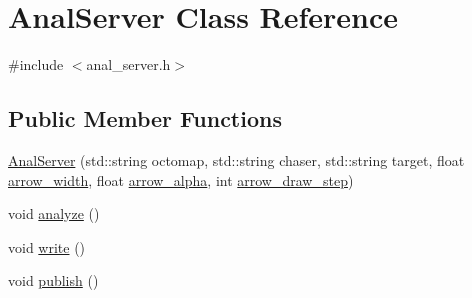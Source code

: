 \hypertarget{class_anal_server}{}\section{Anal\+Server Class Reference}
\label{class_anal_server}


{\ttfamily \#include $<$anal\+\_\+server.\+h$>$}

\subsection*{Public Member Functions}
\begin{DoxyCompactItemize}
\item 
\hyperlink{class_anal_server_a6a00d9bf3bc80d3ea89c33d7ce38a830}{Anal\+Server} (std\+::string octomap, std\+::string chaser, std\+::string target, float \hyperlink{class_anal_server_ae61096e92e5fa0eaec6ee96511eaf1ac}{arrow\+\_\+width}, float \hyperlink{class_anal_server_acfb15e946304bbb248e51470692fa209}{arrow\+\_\+alpha}, int \hyperlink{class_anal_server_a7df3e7d417439f5159feb25fdb11b218}{arrow\+\_\+draw\+\_\+step})
\item 
void \hyperlink{class_anal_server_ac1806fb6193cc3c41c8b3895b0463871}{analyze} ()
\item 
void \hyperlink{class_anal_server_a3b6dc7f5258edba7c6e40e759a532445}{write} ()
\item 
void \hyperlink{class_anal_server_acef9cfef852c66d91a6b345696bdd4cf}{publish} ()
\end{DoxyCompactItemize}

